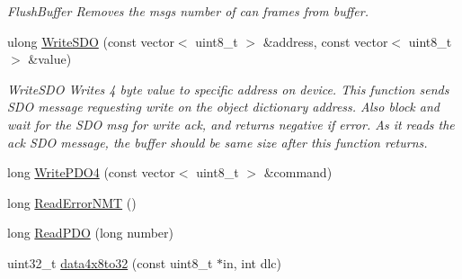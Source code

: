 \begin{DoxyCompactItemize}
\begin{DoxyCompactList}\small\item\em Flush\+Buffer Removes the msgs number of can frames from buffer. \end{DoxyCompactList}\item 
ulong \hyperlink{classCiA301CommPort_a7c55c89b1ccd80dd008240ce3e0409c5}{Write\+S\+DO} (const vector$<$ uint8\+\_\+t $>$ \&address, const vector$<$ uint8\+\_\+t $>$ \&value)
\begin{DoxyCompactList}\small\item\em Write\+S\+DO Writes 4 byte value to specific address on device. This function sends S\+DO message requesting write on the object dictionary address. Also block and wait for the S\+DO msg for write ack, and returns negative if error. As it reads the ack S\+DO message, the buffer should be same size after this function returns. \end{DoxyCompactList}\item 
long \hyperlink{classCiA301CommPort_a1faf4f37530e0dd0ae4600cfb0b1d742}{Write\+P\+D\+O4} (const vector$<$ uint8\+\_\+t $>$ \&command)
\item 
long \hyperlink{classCiA301CommPort_a46534ff9e7e2a05a0b4913e4331710e5}{Read\+Error\+N\+MT} ()
\item 
long \hyperlink{classCiA301CommPort_a827f3e594b9f1e57a7b7ccb8a278404a}{Read\+P\+DO} (long number)
\item 
uint32\+\_\+t \hyperlink{classCiA301CommPort_a2e85303159577f6b3209b741e9871cc5}{data4x8to32} (const uint8\+\_\+t $\ast$in, int dlc)
\end{DoxyCompactItemize}
